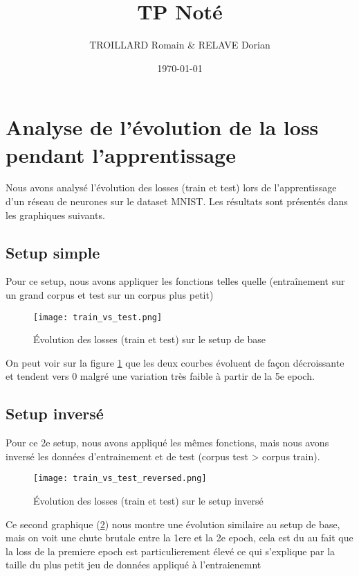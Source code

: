 \documentclass{article}
\title{\textbf{TP Noté}}
\author{TROILLARD Romain \& RELAVE Dorian}
\date{\today}
\begin{document}
\maketitle

\tableofcontents

\newpage

\section{Analyse de l'évolution de la loss pendant l'apprentissage}

Nous avons analysé l'évolution des losses (train et test) lors de l'apprentissage d'un réseau de neurones sur le dataset MNIST. Les résultats sont présentés dans les graphiques suivants.

\subsection{Setup simple}

Pour ce setup, nous avons appliquer les fonctions telles quelle (entraînement sur un grand corpus et test sur un corpus plus petit)

\begin{figure}[H]
    \centering
    \texttt{[image: train\_vs\_test.png]}
    \caption{Évolution des losses (train et test) sur le setup de base}
    \label{fig:train_vs_test}
\end{figure}

On peut voir sur la figure \ref{fig:train_vs_test} que les deux courbes évoluent de façon décroissante et tendent vers 0 malgré une variation très faible à partir de la 5e epoch.

\newpage
\subsection{Setup inversé}

Pour ce 2e setup, nous avons appliqué les mêmes fonctions, mais nous avons inversé les données d'entrainement et de test (corpus test > corpus train).

\begin{figure}[H]
    \centering
    \texttt{[image: train\_vs\_test\_reversed.png]}
    \caption{Évolution des losses (train et test) sur le setup inversé}
    \label{fig:train_vs_test_reversed}
\end{figure}

Ce second graphique (\ref{fig:train_vs_test_reversed}) nous montre une évolution similaire au setup de base, mais on voit une chute brutale entre la 1ere et la 2e epoch, cela est du au fait que la loss de la premiere epoch est particulierement élevé ce qui s'explique par la taille du plus petit jeu de données appliqué à l'entraienemnt
\end{document}
